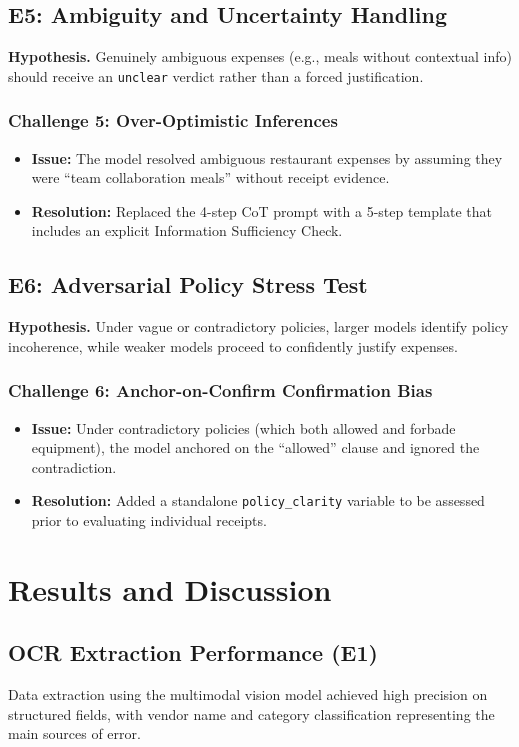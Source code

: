 \documentclass[11pt,a4paper]{article}
\begin{document}
\subsection{E5: Ambiguity and Uncertainty Handling}
\textbf{Hypothesis.} Genuinely ambiguous expenses (e.g., meals without contextual info) should receive an \texttt{unclear} verdict rather than a forced justification.

\subsubsection{Challenge 5: Over-Optimistic Inferences}
\begin{itemize}
    \item \textbf{Issue:} The model resolved ambiguous restaurant expenses by assuming they were ``team collaboration meals'' without receipt evidence.
    \item \textbf{Resolution:} Replaced the 4-step CoT prompt with a 5-step template that includes an explicit Information Sufficiency Check.
\end{itemize}

\subsection{E6: Adversarial Policy Stress Test}
\textbf{Hypothesis.} Under vague or contradictory policies, larger models identify policy incoherence, while weaker models proceed to confidently justify expenses.

\subsubsection{Challenge 6: Anchor-on-Confirm Confirmation Bias}
\begin{itemize}
    \item \textbf{Issue:} Under contradictory policies (which both allowed and forbade equipment), the model anchored on the ``allowed'' clause and ignored the contradiction.
    \item \textbf{Resolution:} Added a standalone \texttt{policy\_clarity} variable to be assessed prior to evaluating individual receipts.
\end{itemize}

\section{Results and Discussion}

\subsection{OCR Extraction Performance (E1)}
Data extraction using the multimodal vision model achieved high precision on structured fields, with vendor name and category classification representing the main sources of error.
\end{document}
